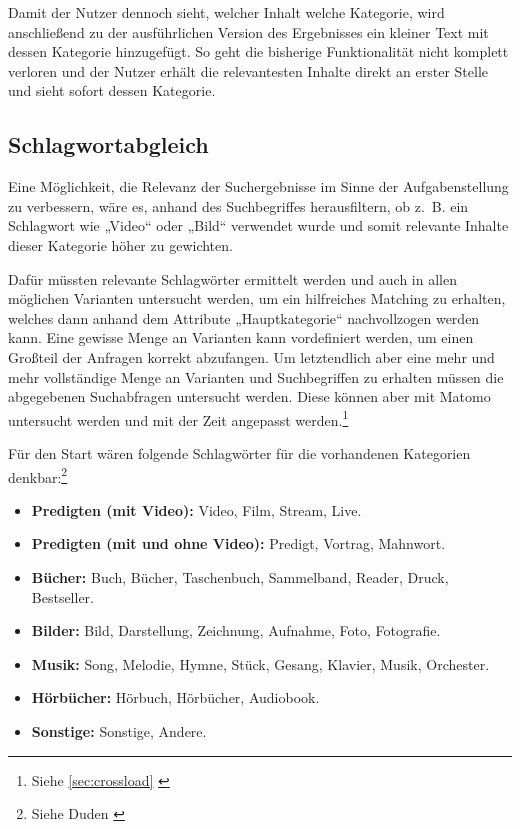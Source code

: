 Damit der Nutzer dennoch sieht, welcher Inhalt welche Kategorie, wird anschließend zu der ausführlichen Version des Ergebnisses ein kleiner Text mit dessen Kategorie hinzugefügt.
So geht die bisherige Funktionalität nicht komplett verloren und der Nutzer erhält die relevantesten Inhalte direkt an erster Stelle und sieht sofort dessen Kategorie.

\subsection{Schlagwortabgleich}
\label{sub:keyword}
Eine Möglichkeit, die Relevanz der Suchergebnisse im Sinne der Aufgabenstellung zu verbessern, wäre es, anhand des Suchbegriffes herausfiltern, ob z. B. ein Schlagwort wie „Video“ oder „Bild“ verwendet wurde und somit relevante Inhalte dieser Kategorie höher zu gewichten.

Dafür müssten relevante Schlagwörter ermittelt werden und auch in allen möglichen Varianten untersucht werden, um ein hilfreiches Matching zu erhalten, welches dann anhand dem Attribute „Hauptkategorie“ nachvollzogen werden kann.
Eine gewisse Menge an Varianten kann vordefiniert werden, um einen Großteil der Anfragen korrekt abzufangen.
Um letztendlich aber eine mehr und mehr vollständige Menge an Varianten und Suchbegriffen zu erhalten müssen die abgegebenen Suchabfragen untersucht werden.
Diese können aber mit Matomo untersucht werden und mit der Zeit angepasst werden.\footnote{Siehe \ref{sec:crossload} \cite{matomo2022}}

Für den Start wären folgende Schlagwörter für die vorhandenen Kategorien denkbar:\footnote{Siehe Duden \cite{dudensynonyme2022}}
\begin{itemize}
  \item \textbf{Predigten (mit Video):} Video, Film, Stream, Live.
  \item \textbf{Predigten (mit und ohne Video):} Predigt, Vortrag, Mahnwort.
  \item \textbf{Bücher:} Buch, Bücher, Taschenbuch, Sammelband, Reader, Druck, Bestseller.
  \item \textbf{Bilder:} Bild, Darstellung, Zeichnung, Aufnahme, Foto, Fotografie.
  \item \textbf{Musik:} Song, Melodie, Hymne, Stück, Gesang, Klavier, Musik, Orchester.
  \item \textbf{Hörbücher:} Hörbuch, Hörbücher, Audiobook.
  \item \textbf{Sonstige:} Sonstige, Andere.
\end{itemize}

